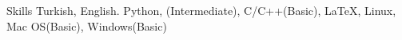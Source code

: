 
\begin{rubric}{Skills}
\entry*[Languages]
	Turkish, English.
	Python, (Intermediate), C/C++(Basic), \LaTeX, 
\entry*[OS\hfill]
	Linux, Mac OS(Basic), Windows(Basic)
\end{rubric}
